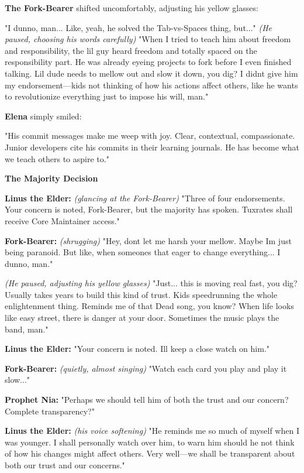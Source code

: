 \textbf{The Fork-Bearer} shifted uncomfortably, adjusting his yellow glasses:

"I dunno, man... Like, yeah, he solved the Tab-vs-Spaces thing, but..." \emph{(He paused, choosing his words carefully)} "When I tried to teach him about freedom and responsibility, the lil\textquotesingle{} guy heard \textquotesingle freedom\textquotesingle{} and totally spaced on the \textquotesingle responsibility\textquotesingle{} part. He was already eyeing projects to fork before I even finished talking. Lil\textquotesingle{} dude needs to mellow out and slow it down, you dig? I didn\textquotesingle t give him my endorsement---kid\textquotesingle s not thinking of how his actions affect others, like he wants to revolutionize everything just to impose his will, man."

\textbf{Elena} simply smiled:

"His commit messages make me weep with joy. Clear, contextual, compassionate. Junior developers cite his commits in their learning journals. He has become what we teach others to aspire to."

\textbf{The Majority Decision}

\textbf{Linus the Elder:} \emph{(glancing at the Fork-Bearer)} "Three of four endorsements. Your concern is noted, Fork-Bearer, but the majority has spoken. Tuxrates shall receive Core Maintainer access."

\textbf{Fork-Bearer:} \emph{(shrugging)} "Hey, don\textquotesingle t let me harsh your mellow. Maybe I\textquotesingle m just being paranoid. But like, when someone\textquotesingle s that eager to change everything... I dunno, man."

\emph{(He paused, adjusting his yellow glasses)} "Just... this is moving real fast, you dig? Usually takes years to build this kind of trust. Kid\textquotesingle s speedrunning the whole enlightenment thing. Reminds me of that Dead song, you know? \textquotesingle When life looks like easy street, there is danger at your door.\textquotesingle{} Sometimes the music plays the band, man."

\textbf{Linus the Elder:} "Your concern is noted. I\textquotesingle ll keep a close watch on him."

\textbf{Fork-Bearer:} \emph{(quietly, almost singing)} "Watch each card you play and play it slow..."

\textbf{Prophet Nia:} "Perhaps we should tell him of both the trust and our concern? Complete transparency?"

\textbf{Linus the Elder:} \emph{(his voice softening)} "He reminds me so much of myself when I was younger. I shall personally watch over him, to warn him should he not think of how his changes might affect others. Very well---we shall be transparent about both our trust and our concerns."

